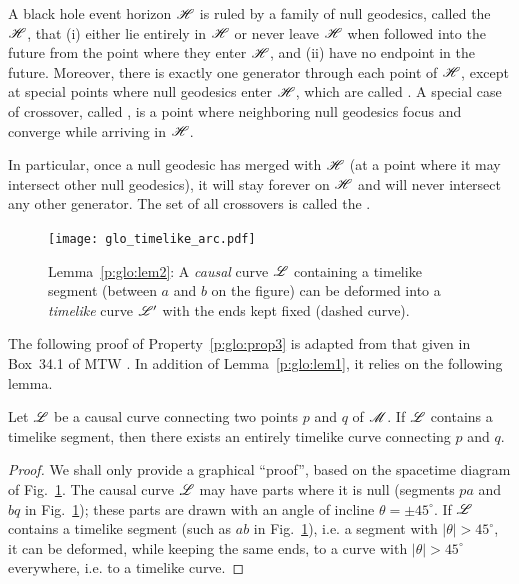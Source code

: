 \begin{prop}
\label{p:glo:prop3}
A black hole event horizon $\mathscr{H}$ is ruled by a family of null geodesics,
called the  $\mathscr{H}$,
 that (i) either lie entirely
in $\mathscr{H}$ or never leave $\mathscr{H}$ when followed into the future from the
point where they enter $\mathscr{H}$, and
(ii) have no endpoint in the future.
Moreover, there is exactly one generator through each point of $\mathscr{H}$,
except at special points where null geodesics enter $\mathscr{H}$, which are
called . A special case
of crossover, called , is a point
where neighboring null geodesics focus and converge while arriving in $\mathscr{H}$.
\end{prop}
In particular, once a null geodesic has
merged with $\mathscr{H}$ (at a point where it may intersect other null geodesics),
it will stay forever on $\mathscr{H}$ and will never intersect any other generator.
The set of all crossovers is called the 
\cite{Siino98a,Siino98b,Brill14}.

\begin{figure}
\centerline{\texttt{[image: glo\_timelike\_arc.pdf]}}
\caption[]{\label{f:glo:timelike_arc} \footnotesize
Lemma~\ref{p:glo:lem2}: A \emph{causal} curve $\mathscr{L}$ containing a timelike segment (between
$a$ and $b$ on the figure) can be deformed into a \emph{timelike} curve $\mathscr{L}'$
with the ends kept fixed (dashed curve).}
\end{figure}

The following proof of Property~\ref{p:glo:prop3}
is adapted from that given in Box~34.1 of MTW \cite{MisneTW73}.
In addition of Lemma~\ref{p:glo:lem1}, it relies on the following lemma.

\begin{lemma}
\label{p:glo:lem2}
Let $\mathscr{L}$ be a causal curve connecting two points $p$ and $q$
of $\mathscr{M}$. If $\mathscr{L}$ contains a timelike segment, then there exists an
entirely timelike curve connecting $p$ and $q$.
\end{lemma}
\begin{proof}
We shall only provide a graphical ``proof'', based on the spacetime diagram
of Fig.~\ref{f:glo:timelike_arc}. The causal curve $\mathscr{L}$ may have parts where it is null (segments $pa$ and $bq$ in Fig.~\ref{f:glo:timelike_arc}); these parts are drawn with
an angle of incline $\theta = \pm 45^\circ$.
If $\mathscr{L}$ contains a timelike segment (such as $ab$ in Fig.~\ref{f:glo:timelike_arc}), i.e. a segment with $|\theta|>45^\circ$,
it can be deformed, while keeping the same ends, to a curve with $|\theta|>45^\circ$
everywhere, i.e. to a timelike curve.
\end{proof}

